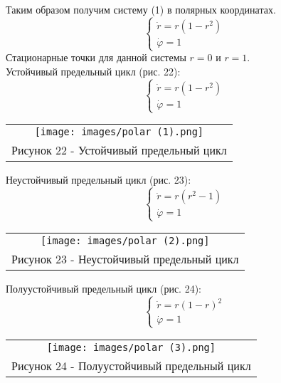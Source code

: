 Таким образом получим систему (1) в полярных координатах.
\begin{equation}
  \begin{cases}
    \dot{r}=r(1-r^2)\\
    \dot{\varphi}=1
  \end{cases}
\end{equation}
Стационарные точки для данной системы $r=0$ и $r=1$.\\
Устойчивый предельный цикл (рис. 22):
\begin{equation}
  \begin{cases}
    \dot{r}=r(1-r^2)\\
    \dot{\varphi}=1
  \end{cases}
\end{equation}

\begin{center}
  \begin{tabular}{c}
    \texttt{[image: images/polar (1).png]}\\
    Рисунок 22 - Устойчивый предельный цикл
  \end{tabular}
\end{center}

Неустойчивый предельный цикл (рис. 23):
\begin{equation}
  \begin{cases}
    \dot{r}=r(r^2-1)\\
    \dot{\varphi}=1
  \end{cases}
\end{equation}

\begin{center}
  \begin{tabular}{c}
    \texttt{[image: images/polar (2).png]}\\
    Рисунок 23 - Неустойчивый предельный цикл
  \end{tabular}
\end{center}

Полуустойчивый предельный цикл (рис. 24):
\begin{equation}
  \begin{cases}
    \dot{r}=r(1-r)^2\\
    \dot{\varphi}=1
  \end{cases}
\end{equation}

\begin{center}
  \begin{tabular}{c}
    \texttt{[image: images/polar (3).png]}\\
    Рисунок 24 - Полуустойчивый предельный цикл
  \end{tabular}
\end{center}

